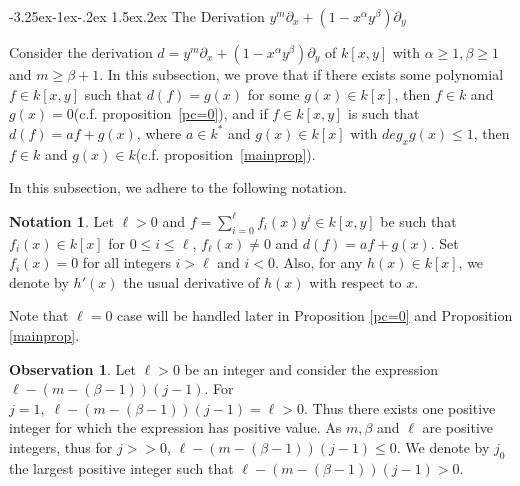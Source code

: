 \documentclass[12pt,reqno]{amsart}
\makeatletter
\renewcommand{\subsection}{%
  \@startsection{subsection}{2}{\z@}%
    {-3.25ex\@plus -1ex\@minus -.2ex}%
    {1.5ex\@plus .2ex}%
    {\normalfont\bfseries}}
\renewcommand{\leq}{\leqslant}
\renewcommand{\geq}{\geqslant}
\numberwithin{thm}{section}
\theoremstyle{definition}
\newtheorem{nota}[thm]{Notation}
\newtheorem{obs}[thm]{Observation}
\numberwithin{equation}{thm}
\theoremstyle{plain}
\makeatother
\begin{document}
\subsection{The Derivation $y^m\partial_x+(1-x^{\alpha} y^{\beta})\partial_y$}

Consider the derivation $d=y^m\partial_x+(1-x^{\alpha} y^{\beta})\partial_y$ of $k[x,y]$ with $\alpha\geq 1, \beta\geq 1$ and $m\geq \beta+1$. In this subsection, we prove that if there exists some polynomial $f\in k[x,y]$ such that $d(f)=g(x)$ for some $g(x)\in k[x]$, then $f\in k$ and $g(x)=0$(c.f. proposition~\ref{pc=0}), and if $f\in k[x,y]$ is such that $d(f)=af+g(x)$, where $a\in k^\ast$ and $g(x)\in k[x]$ with $deg_x g(x)\leq 1$, then $f\in k$ and $g(x)\in k$(c.f. proposition~\ref{mainprop}).

\noindent In this subsection, we adhere to the following notation.
\begin{nota}\label{nota:1}
   Let $\ell>0$ and $f=\sum_{i=0}^{\ell}f_i(x)y^i\in k[x,y]$ be such that $f_i(x)\in k[x]$ for $0\le i \leq\ell$, $f_\ell(x) \neq 0$ and $d(f)=af+g(x)$. Set $f_i(x)=0$ for all integers $i>\ell$ and $i<0$. Also, for any $h(x)\in k[x]$, we denote by $h'(x)$ the usual derivative of $h(x)$ with respect to $x$.
\end{nota}
\noindent Note that $\ell=0$ case will be handled later in Proposition \ref{pc=0} and Proposition \ref{mainprop}.
\begin{obs}\label{obs:1}
    Let $\ell>0$ be an integer and consider the expression $\ell-(m-(\beta-1))(j-1)$. For $j=1,\; \ell-(m-(\beta-1))(j-1)=\ell>0 $. Thus there exists one positive integer for which the expression has positive value. As $m,\beta$ and $\ell$ are positive integers, thus for $j>>0$, $\ell-(m-(\beta-1))(j-1)\leq0$. We denote by $j_0$ the largest positive integer such that $\ell-(m-(\beta-1))(j-1)>0$.
\end{obs}
\end{document}
